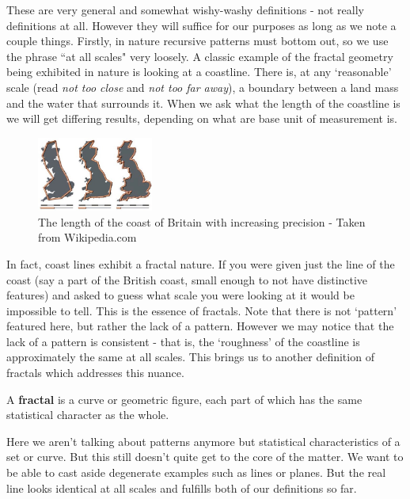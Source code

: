 \documentclass[11pt,oneside,final]{article}
\begin{document}

These are very general and somewhat wishy-washy definitions - not really
definitions at all. However they will suffice for our purposes as long as we
note a couple things. Firstly, in nature recursive patterns must bottom out, so
we use the phrase ``at all scales" very loosely. A classic example of the
fractal geometry being exhibited in nature is looking at a coastline. There is,
at any `reasonable' scale (read \emph{not too close} and \emph{not too far
away}), a boundary between a land mass and the water that surrounds it. When we
ask what the length of the coastline is we will get differing results,
depending on what are base unit of measurement is.\\


\begin{figure}
	\centering
	\includegraphics[width=0.34\textwidth]{Britain-fractal-coastline}
	\caption{The length of the coast of Britain with increasing precision -
	Taken from Wikipedia.com}
\end{figure}
In fact, coast lines exhibit a fractal nature. If you were given just the line
of the coast (say a part of the British coast, small enough to not have
distinctive features) and asked to guess what scale you were looking at it
would be impossible to tell. This is the essence of fractals. Note that there
is not `pattern' featured here, but rather the lack of a pattern. However we
may notice that the lack of a pattern is consistent - that is, the `roughness'
of the coastline is approximately the same at all scales. This brings us to
another definition of fractals which addresses this nuance.
\begin{dfn}
	A \textbf{fractal} is a curve or geometric figure, each part of which has
	the same statistical character as the whole.\cite{google}
\end{dfn}

Here we aren't talking about patterns anymore but statistical characteristics
of a set or curve. But this still doesn't quite get to the core of the matter.
We want to be able to cast aside degenerate examples such as lines or planes.
But the real line looks identical at all scales and fulfills both of our 
definitions so far.
\end{document}
